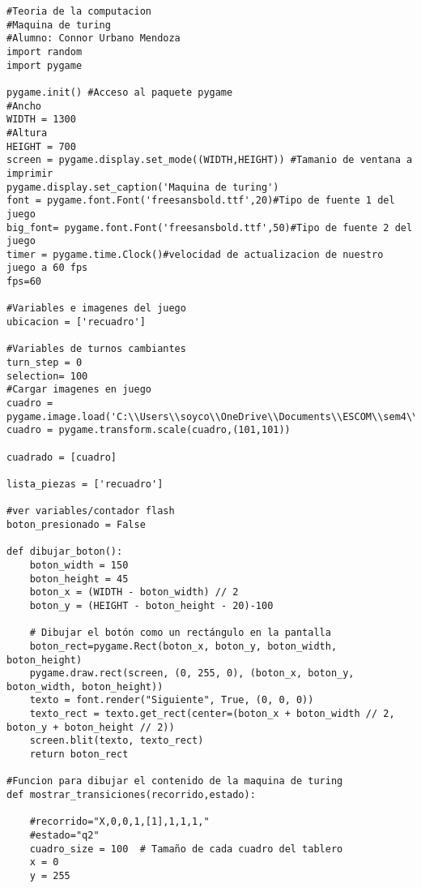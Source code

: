 \begin{lstlisting}
#Teoria de la computacion
#Maquina de turing
#Alumno: Connor Urbano Mendoza
import random
import pygame

pygame.init() #Acceso al paquete pygame
#Ancho
WIDTH = 1300
#Altura
HEIGHT = 700
screen = pygame.display.set_mode((WIDTH,HEIGHT)) #Tamanio de ventana a imprimir
pygame.display.set_caption('Maquina de turing')
font = pygame.font.Font('freesansbold.ttf',20)#Tipo de fuente 1 del juego
big_font= pygame.font.Font('freesansbold.ttf',50)#Tipo de fuente 2 del juego
timer = pygame.time.Clock()#velocidad de actualizacion de nuestro juego a 60 fps
fps=60

#Variables e imagenes del juego
ubicacion = ['recuadro']

#Variables de turnos cambiantes
turn_step = 0
selection= 100
#Cargar imagenes en juego
cuadro = pygame.image.load('C:\\Users\\soyco\\OneDrive\\Documents\\ESCOM\\sem4\\Teoria\\P2\\turing\\img\\cuadro.png')
cuadro = pygame.transform.scale(cuadro,(101,101))

cuadrado = [cuadro]

lista_piezas = ['recuadro']

#ver variables/contador flash
boton_presionado = False

def dibujar_boton():
    boton_width = 150
    boton_height = 45
    boton_x = (WIDTH - boton_width) // 2
    boton_y = (HEIGHT - boton_height - 20)-100

    # Dibujar el botón como un rectángulo en la pantalla
    boton_rect=pygame.Rect(boton_x, boton_y, boton_width, boton_height)
    pygame.draw.rect(screen, (0, 255, 0), (boton_x, boton_y, boton_width, boton_height))
    texto = font.render("Siguiente", True, (0, 0, 0))
    texto_rect = texto.get_rect(center=(boton_x + boton_width // 2, boton_y + boton_height // 2))
    screen.blit(texto, texto_rect)
    return boton_rect
   
#Funcion para dibujar el contenido de la maquina de turing
def mostrar_transiciones(recorrido,estado):
    
    #recorrido="X,0,0,1,[1],1,1,1,"
    #estado="q2"
    cuadro_size = 100  # Tamaño de cada cuadro del tablero
    x = 0
    y = 255
    

\end{lstlisting}
